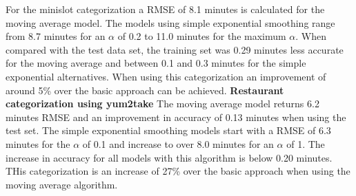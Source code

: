 For the minislot categorization a RMSE of 8.1 minutes is calculated for the moving average model. The models using simple exponential smoothing range from 8.7 minutes for an $\alpha$ of 0.2 to 11.0 minutes for the maximum $\alpha$. When compared with the test data set, the training set was 0.29 minutes less accurate for the moving average and between 0.1 and 0.3 minutes for the simple exponential alternatives.\newline
When using this categorization an improvement of around 5\% over the basic approach can be achieved.
\newline\newline\textbf{Restaurant categorization using yum2take}\newline
The moving average model returns 6.2 minutes RMSE and an improvement in accuracy of 0.13 minutes when using the test set. The simple exponential smoothing models start with a RMSE of 6.3 minutes for the $\alpha$ of 0.1 and increase to over 8.0 minutes for an $\alpha$ of 1. The increase in accuracy for all models with this algorithm is below 0.20 minutes.\newline
THis categorization is an increase of 27\% over the basic approach when using the moving average algorithm.
